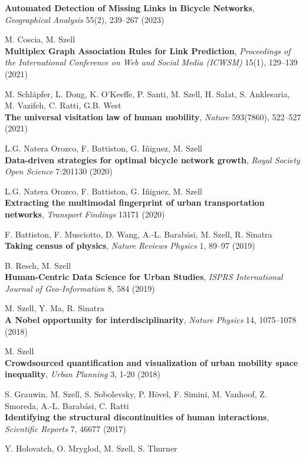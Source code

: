 \documentclass[10pt,a4paper]{article}
\begin{document}
\begin{etaremune}
    \textbf{Automated Detection of Missing Links in Bicycle Networks}, \textit{Geographical Analysis} 55(2), 239--267 (2023)
\item M. Coscia, M. Szell\\
    \textbf{Multiplex Graph Association Rules for Link Prediction}, \textit{Proceedings of the International Conference on Web and Social Media (ICWSM)} 15(1), 129--139 (2021)
\item M. Schläpfer, L. Dong, K. O'Keeffe, P. Santi, M. Szell, H. Salat, S. Anklesaria, M. Vazifeh, C. Ratti, G.B. West\\
    \textbf{The universal visitation law of human mobility}, \textit{Nature} 593(7860), 522--527 (2021)
\item L.G. Natera Orozco, F. Battiston, G. I{\~n}iguez, M. Szell\\
    \textbf{Data-driven strategies for optimal bicycle network growth}, \textit{Royal Society Open Science} 7:201130 (2020)
\item L.G. Natera Orozco, F. Battiston, G. Iñiguez, M. Szell\\
    \textbf{Extracting the multimodal fingerprint of urban transportation networks}, \textit{Transport Findings} 13171 (2020)
\item F. Battiston, F. Musciotto, D. Wang, A.-L. Barab\'asi, M. Szell, R. Sinatra\\
    \textbf{Taking census of physics}, \textit{Nature Reviews Physics} 1, 89--97 (2019)
\item B. Resch, M. Szell\\
    \textbf{Human-Centric Data Science for Urban Studies}, \textit{ISPRS International Journal of Geo-Information}  8, 584 (2019)
\item M. Szell, Y. Ma, R. Sinatra\\
    \textbf{A Nobel opportunity for interdisciplinarity}, \textit{Nature Physics} 14, 1075--1078 (2018)
\item M. Szell\\
    \textbf{Crowdsourced quantification and visualization of urban mobility space inequality}, \textit{Urban Planning} 3, 1-20 (2018)
\item S. Grauwin, M. Szell, S. Sobolevsky, P. H\"{o}vel, F. Simini, M. Vanhoof, Z. Smoreda, A.-L. Barab\'asi, C. Ratti\\
    \textbf{Identifying the structural discontinuities of human interactions}, \textit{Scientific Reports} 7, 46677 (2017)
\item Y. Holovatch, O. Mryglod, M. Szell, S. Thurner\\

\end{etaremune}
\end{document}
